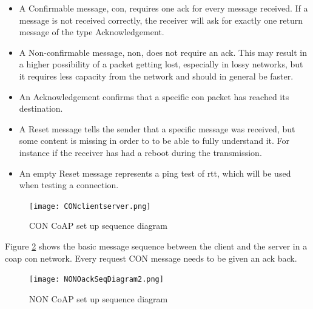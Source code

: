 
\begin{itemize}
	\item A Confirmable message, \gls{con}, requires one \gls{ack} for every message received. If a message is not received correctly, the receiver will ask for exactly one return message of the type Acknowledgement. 
	\item A Non-confirmable message, \gls{non}, does not require an \gls{ack}. This may result in a higher possibility of a packet getting lost, especially in lossy networks, but it requires less capacity from the network and should in general be faster. 
	\item An Acknowledgement confirms that a specific \gls{con} packet has reached its destination. 
	\item A Reset message tells the sender that a specific message was received, but some content is missing in order to to be able to fully understand it. For instance if the receiver has had a reboot during the transmission. 
	\item An empty Reset message represents a ping test of \gls{rtt}, which will be used when testing a connection. 
\end{itemize}
       


\begin{figure}[ht]
    \centering
    \texttt{[image: CONclientserver.png]}    
    \caption{CON CoAP set up sequence diagram \cite{shelby2014constrained}}
    \label{fig:CONclientserver}
\end{figure}

\noindent Figure \ref{fig:NONOackSeqDiagram} shows the basic message sequence between the client and the server in a \gls{coap} \gls{con} network. Every request CON message needs to be given an \gls{ack} back. 

\begin{figure}[ht]
    \centering
    \texttt{[image: NONOackSeqDiagram2.png]}    
    \caption{NON CoAP set up sequence diagram \cite{shelby2014constrained}}
    \label{fig:NONOackSeqDiagram}
\end{figure}


